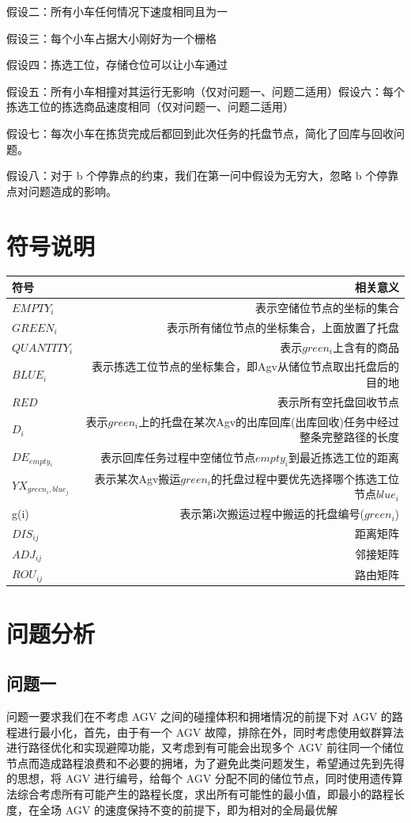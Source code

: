 \documentclass{article}
\begin{document}
假设二：所有小车任何情况下速度相同且为一

假设三：每个小车占据大小刚好为一个栅格

假设四：拣选工位，存储仓位可以让小车通过

假设五：所有小车相撞对其运行无影响（仅对问题一、问题二适用）假设六：每个拣选工位的拣选商品速度相同（仅对问题一、问题二适用）

假设七：每次小车在拣货完成后都回到此次任务的托盘节点，简化了回库与回收问题。

假设八：对于 b 个停靠点的约束，我们在第一问中假设为无穷大，忽略 b 个停靠点对问题造成的影响。



\section{符号说明}


\begin{tabular}{l|r}
		\centering
		符号 & 相关意义 \\\hline
		$EMPTY_i$ & 表示空储位节点的坐标的集合 \\
		$GREEN_i$ & 表示所有储位节点的坐标集合，上面放置了托盘\\
		$QUANTITY_i$ & 表示$green_i$上含有的商品\\
		$BLUE_i$ & 表示拣选工位节点的坐标集合，即Agv从储位节点取出托盘后的目的地\\
		$RED$ & 表示所有空托盘回收节点\\
		$D_i$ & 表示$green_i$上的托盘在某次Agv的出库回库(出库回收)任务中经过整条完整路径的长度\\
		$DE_{empty_i}$ & 表示回库任务过程中空储位节点$empty_i$到最近拣选工位的距离\\
		$YX_{green_i,blue_j}$ & 表示某次Agv搬运$green_i$的托盘过程中要优先选择哪个拣选工位节点$blue_i$\\
		g(i) & 表示第i次搬运过程中搬运的托盘编号($green_i$)\\
		$DIS_{ij}$ & 距离矩阵\\
		$ADJ_{ij}$ & 邻接矩阵\\
		$ROU_{ij}$ & 路由矩阵\\
\end{tabular}


\section{问题分析}
\subsection{问题一}
问题一要求我们在不考虑 AGV 之间的碰撞体积和拥堵情况的前提下对 AGV 的路程进行最小化，首先，由于有一个 AGV 故障，排除在外，同时考虑使用蚁群算法进行路径优化和实现避障功能，又考虑到有可能会出现多个 AGV 前往同一个储位节点而造成路程浪费和不必要的拥堵，为了避免此类问题发生，希望通过先到先得的思想，将 AGV 进行编号，给每个 AGV 分配不同的储位节点，同时使用遗传算法综合考虑所有可能产生的路程长度，求出所有可能性的最小值，即最小的路程长度，在全场 AGV 的速度保持不变的前提下，即为相对的全局最优解
\end{document}
